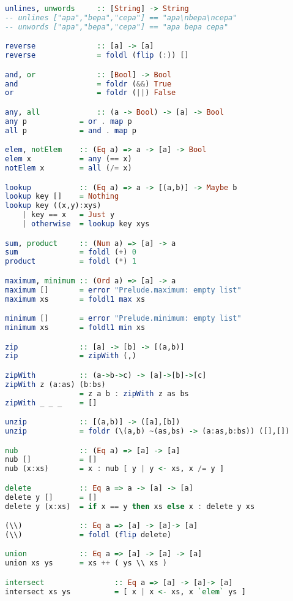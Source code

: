 \documentclass[a4paper]{article}
\begin{document}
\begin{lstlisting}[numbers=none, multicols=2,language=Haskell]
unlines, unwords     :: [String] -> String
-- unlines ["apa","bepa","cepa"] == "apa\nbepa\ncepa" 
-- unwords ["apa","bepa","cepa"] == "apa bepa cepa"

reverse              :: [a] -> [a]
reverse              = foldl (flip (:)) []

and, or              :: [Bool] -> Bool
and                  = foldr (&&) True
or                   = foldr (||) False

any, all             :: (a -> Bool) -> [a] -> Bool
any p            = or . map p
all p            = and . map p

elem, notElem    :: (Eq a) => a -> [a] -> Bool
elem x           = any (== x)
notElem x        = all (/= x)

lookup           :: (Eq a) => a -> [(a,b)] -> Maybe b
lookup key []    = Nothing
lookup key ((x,y):xys)
    | key == x   = Just y
    | otherwise  = lookup key xys

sum, product     :: (Num a) => [a] -> a
sum              = foldl (+) 0
product          = foldl (*) 1

maximum, minimum :: (Ord a) => [a] -> a
maximum []       = error "Prelude.maximum: empty list"
maximum xs       = foldl1 max xs

minimum []       = error "Prelude.minimum: empty list"
minimum xs       = foldl1 min xs

zip              :: [a] -> [b] -> [(a,b)]
zip              = zipWith (,)

zipWith          :: (a->b->c) -> [a]->[b]->[c]
zipWith z (a:as) (b:bs)
                 = z a b : zipWith z as bs
zipWith _ _ _    = []

unzip            :: [(a,b)] -> ([a],[b])
unzip            = foldr (\(a,b) ~(as,bs) -> (a:as,b:bs)) ([],[])

nub              :: (Eq a) => [a] -> [a]
nub []           = []
nub (x:xs)       = x : nub [ y | y <- xs, x /= y ]

delete           :: Eq a => a -> [a] -> [a]
delete y []      = []
delete y (x:xs)  = if x == y then xs else x : delete y xs

(\\)             :: Eq a => [a] -> [a]-> [a]
(\\)             = foldl (flip delete)

union            :: Eq a => [a] -> [a] -> [a]
union xs ys      = xs ++ ( ys \\ xs )

intersect                :: Eq a => [a] -> [a]-> [a]
intersect xs ys          = [ x | x <- xs, x `elem` ys ]


\end{lstlisting}
\end{document}
